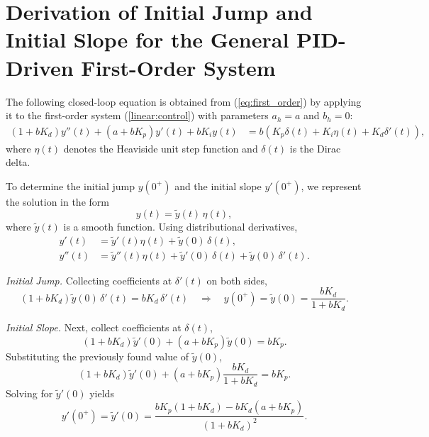 \documentclass[preprint,12pt]{elsarticle}
\begin{document}
\section{Derivation of Initial Jump and Initial Slope for the General PID-Driven First-Order System}\label{app:IJandIS}
The following closed-loop equation is obtained from (\ref{eq:first_order}) by applying it to the first-order system (\ref{linear:control}) with parameters 
$a_h=a$ and $b_h=0$:
\begin{equation*}
	\begin{aligned}
		(1 + b K_d) y''(t) + (a + b K_p) y'(t) + b K_i y(t) 
		&= b \left(K_p \delta(t) +  K_i \eta(t) +  K_d \delta'(t)\right),
	\end{aligned}
\end{equation*}
where $\eta(t)$ denotes the Heaviside unit step function and $\delta(t)$ is the Dirac delta. 

To determine the initial jump $y(0^+)$ and the initial slope $y'(0^+)$, we represent the solution in the form
\begin{equation*}
	y(t) = \tilde y(t) \, \eta(t),
\end{equation*}
where $\tilde y(t)$ is a smooth function. Using distributional derivatives,
\begin{align*}
	y'(t) &= \tilde y'(t) \eta(t) + \tilde y(0)\, \delta(t), \\
	y''(t) &= \tilde y''(t) \eta(t) + \tilde y'(0)\, \delta(t) + \tilde y(0)\, \delta'(t).
\end{align*}


\emph{Initial Jump.} Collecting coefficients at $\delta'(t)$ on both sides,
\[
(1 + b K_d) \tilde y(0) \, \delta'(t) = b K_d \, \delta'(t) \quad \Longrightarrow \quad
y(0^+) = \tilde y(0) = \frac{b K_d}{1 + b K_d}.
\]

\emph{Initial Slope.} Next, collect coefficients at $\delta(t)$,
\[
(1 + b K_d) \tilde y'(0) + (a + b K_p) \tilde y(0) = b K_p.
\]
Substituting the previously found value of $\tilde y(0)$,
\[
(1 + b K_d) \tilde y'(0) + (a + b K_p) \frac{b K_d}{1 + b K_d} = b K_p.
\]
Solving for $\tilde y'(0)$ yields
\[
y'(0^+) = \tilde y'(0) = \frac{b K_p (1 + b K_d) - b K_d (a + b K_p)}{(1 + b K_d)^2}.
\]
\end{document}
